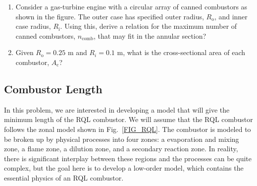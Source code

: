 \documentclass[11pt]{article}
\begin{document}
\begin{enumerate}[label=(\alph*)]
	\item
    	Consider a gas-turbine engine with a circular array of canned combustors as shown in the figure. The outer case has specified outer radius, $R_\mathrm{o}$, and inner case radius, $R_\mathrm{i}$. Using this, derive a relation for the maximum number of canned combustors, $n_\mathrm{comb}$, that may fit in the annular section? 
    \item Given $R_\mathrm{o}=0.25$ m and $R_i=0.1$ m, what is the cross-sectional area of each combustor, $A_\mathrm{c}$?
\end{enumerate}
\subsection{Combustor Length}
In this problem, we are interested in developing a model that will give the minimum length of the RQL combustor. We will assume that the RQL combustor follows the zonal model shown in Fig.~\ref{FIG_RQL}. The combustor is modeled to be broken up by physical processes into four zones: a evaporation and mixing zone, a flame zone, a dilution zone, and a secondary reaction zone. In reality, there is significant interplay between these regions and the processes can be quite complex, but the goal here is to develop a low-order model, which contains the essential physics of an RQL combustor. 
\end{document}
